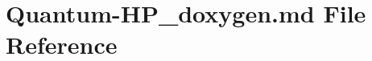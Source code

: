 \hypertarget{Quantum-HP__doxygen_8md}{\section{Quantum-\/\-H\-P\-\_\-doxygen.md File Reference}
\label{Quantum-HP__doxygen_8md}
}
